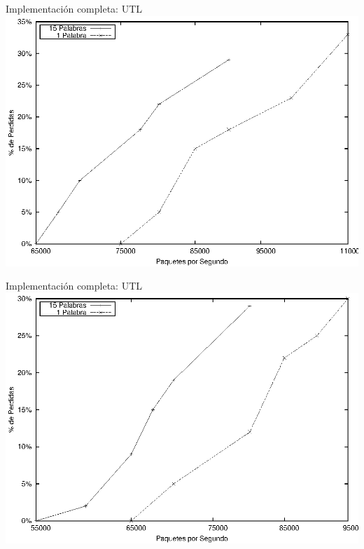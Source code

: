 \documentclass[xcolor=dvipsnames]{beamer}
\begin{document}
\begin{frame}{Implementación completa: UTL} 
\center	
\includegraphics[scale=0.70]{figures/utlprom.eps} 
\end{frame}


\begin{frame}{Implementación completa: UTL} 
\center	
\includegraphics[scale=0.70]{figures/utlmax.eps} 
\end{frame}
\end{document}

